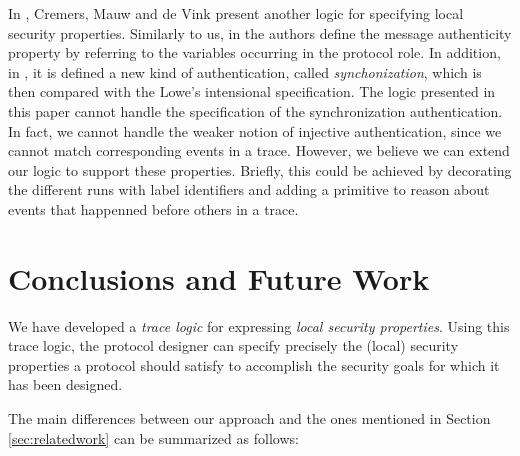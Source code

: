 \documentclass{entcs} \usepackage{entcsmacro}
\begin{document}
In \cite{cmv03}, Cremers, Mauw and de Vink present another logic for
specifying local security properties.  Similarly to us, in
\cite{cmv03} the authors define the message authenticity property
by referring to the variables occurring in the protocol role.
In addition, in \cite{cmv03}, it is defined a new kind of
authentication, called \emph{synchonization}, which is then compared
with the Lowe's intensional specification.  The logic presented in
this paper cannot handle the specification of the synchronization
authentication. In fact, we cannot handle the weaker notion of
injective authentication, since we cannot match corresponding events
in a trace. However, we believe we can extend our logic to support
these properties.  Briefly, this could be achieved by decorating the
different runs with label identifiers and adding a primitive to reason
about events that happenned before others in a trace.




\section{Conclusions and Future Work}
\label{sec:conclusions}
We have developed a \emph{trace logic} for expressing \emph{ local
security properties}.  Using this trace logic, the protocol designer
can specify precisely the (local) security properties a protocol should
satisfy to accomplish the security goals for which it has been
designed.


The main differences between our approach and the ones mentioned in
Section \ref{sec:relatedwork} can be summarized as follows:
\end{document}
